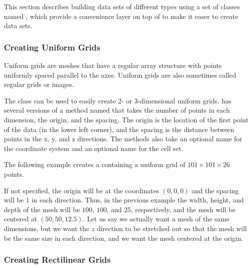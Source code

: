 This section describes building data sets of different types using a set of
classes named , which provide a convenience layer
on top of  to make it easer to create data sets.

\subsubsection{Creating Uniform Grids}



Uniform grids are meshes that have a regular array structure with points
uniformly spaced parallel to the axes. Uniform grids are also sometimes
called regular grids or images.

The  class can be used to easily create 2-
or 3-dimensional uniform grids.  has
several versions of a method named  that takes the number
of points in each dimension, the origin, and the spacing. The origin is the
location of the first point of the data (in the lower left corner), and the
spacing is the distance between points in the x, y, and z directions. The
 methods also take an optional name for the coordinate
system and an optional name for the cell set.

The following example creates a  containing a uniform
grid of $101 \times 101 \times 26$ points.


If not specified, the origin will be at the coordinates $(0,0,0)$ and the
spacing will be $1$ in each direction. Thus, in the previous example the
width, height, and depth of the mesh will be $100$, $100$, and $25$,
respectively, and the mesh will be centered at $(50, 50, 12.5)$. Let us say
we actually want a mesh of the same dimensions, but we want the $z$
direction to be stretched out so that the mesh will be the same size in
each direction, and we want the mesh centered at the origin.


\subsubsection{Creating Rectilinear Grids}

